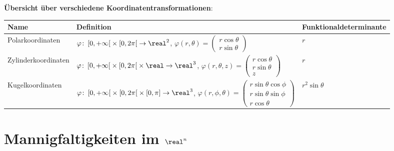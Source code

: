 \linie

\textbf{Übersicht über verschiedene Koordinatentransformationen}:

\begin{tabular}{p{40mm}p{66mm}p{50mm}}
    \toprule

    \textbf{Name} & \textbf{Definition} & \textbf{Funktionaldeterminante} \\

    \midrule

    Polarkoordinaten &
    $\varphi\colon \left[0, +\infty\right[ \times \left[0, 2\pi\right[
    \rightarrow \real^2$, \newline
    $\varphi(r, \theta) = \begin{pmatrix}r \cos \theta \\
    r \sin \theta\end{pmatrix}$ &
    $r$ \\

    \midrule

    Zylinderkoordinaten &
    $\varphi\colon \left[0, +\infty\right[ \times
    \left[0, 2\pi\right[ \times \real \rightarrow \real^3$, \newline
    $\varphi(r, \theta, z) = \begin{pmatrix}r \cos \theta \\
    r \sin \theta \\ z\end{pmatrix}$ &
    $r$ \\

    \midrule

    Kugelkoordinaten &
    $\varphi\colon \left[0, +\infty\right[ \times
    \left[0, 2\pi\right[ \times [0, \pi] \rightarrow \real^3$, \newline
    $\varphi(r, \phi, \theta) = \begin{pmatrix}r \sin \theta \cos \phi \\
    r \sin \theta \sin \phi \\ r \cos \theta\end{pmatrix}$ &
    $r^2 \sin \theta$ \\

    \bottomrule
\end{tabular}

\pagebreak

\section{%
    \texorpdfstring{Mannigfaltigkeiten im $\real^n$}%
    {Mannigfaltigkeiten im ℝⁿ}%
}

